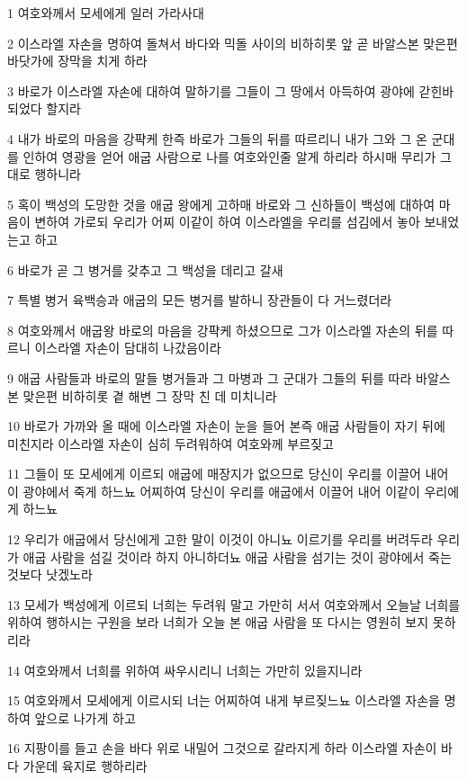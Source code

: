 \par 1 여호와께서 모세에게 일러 가라사대
\par 2 이스라엘 자손을 명하여 돌쳐서 바다와 믹돌 사이의 비하히롯 앞 곧 바알스본 맞은편 바닷가에 장막을 치게 하라
\par 3 바로가 이스라엘 자손에 대하여 말하기를 그들이 그 땅에서 아득하여 광야에 갇힌바 되었다 할지라
\par 4 내가 바로의 마음을 강퍅케 한즉 바로가 그들의 뒤를 따르리니 내가 그와 그 온 군대를 인하여 영광을 얻어 애굽 사람으로 나를 여호와인줄 알게 하리라 하시매 무리가 그대로 행하니라
\par 5 혹이 백성의 도망한 것을 애굽 왕에게 고하매 바로와 그 신하들이 백성에 대하여 마음이 변하여 가로되 우리가 어찌 이같이 하여 이스라엘을 우리를 섬김에서 놓아 보내었는고 하고
\par 6 바로가 곧 그 병거를 갖추고 그 백성을 데리고 갈새
\par 7 특별 병거 육백승과 애굽의 모든 병거를 발하니 장관들이 다 거느렸더라
\par 8 여호와께서 애굽왕 바로의 마음을 강퍅케 하셨으므로 그가 이스라엘 자손의 뒤를 따르니 이스라엘 자손이 담대히 나갔음이라
\par 9 애굽 사람들과 바로의 말들 병거들과 그 마병과 그 군대가 그들의 뒤를 따라 바알스본 맞은편 비하히롯 곁 해변 그 장막 친 데 미치니라
\par 10 바로가 가까와 올 때에 이스라엘 자손이 눈을 들어 본즉 애굽 사람들이 자기 뒤에 미친지라 이스라엘 자손이 심히 두려워하여 여호와께 부르짖고
\par 11 그들이 또 모세에게 이르되 애굽에 매장지가 없으므로 당신이 우리를 이끌어 내어 이 광야에서 죽게 하느뇨 어찌하여 당신이 우리를 애굽에서 이끌어 내어 이같이 우리에게 하느뇨
\par 12 우리가 애굽에서 당신에게 고한 말이 이것이 아니뇨 이르기를 우리를 버려두라 우리가 애굽 사람을 섬길 것이라 하지 아니하더뇨 애굽 사람을 섬기는 것이 광야에서 죽는 것보다 낫겠노라
\par 13 모세가 백성에게 이르되 너희는 두려워 말고 가만히 서서 여호와께서 오늘날 너희를 위하여 행하시는 구원을 보라 너희가 오늘 본 애굽 사람을 또 다시는 영원히 보지 못하리라
\par 14 여호와께서 너희를 위하여 싸우시리니 너희는 가만히 있을지니라
\par 15 여호와께서 모세에게 이르시되 너는 어찌하여 내게 부르짖느뇨 이스라엘 자손을 명하여 앞으로 나가게 하고
\par 16 지팡이를 들고 손을 바다 위로 내밀어 그것으로 갈라지게 하라 이스라엘 자손이 바다 가운데 육지로 행하리라
